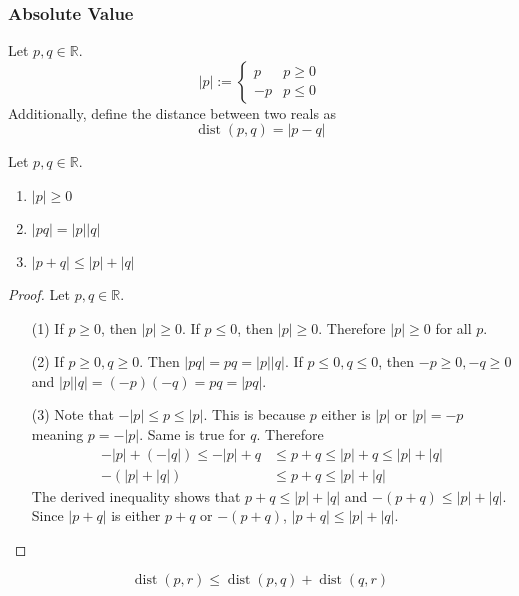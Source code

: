 \documentclass[../notes.tex]{subfiles}
\begin{document}
\subsubsection{Absolute Value}

\begin{definition}
	Let $p, q \in \mathbb{R}$.
	\[
		|p| := \begin{cases}
			p & p \geq 0 \\
			-p & p \leq 0
		\end{cases}
	\]
	Additionally, define the distance between two reals as
	\[
		\operatorname{dist}(p,q) = | p - q |
	\]
\end{definition}

\begin{theorem}
	\label{thm:propsabsvalue}
	Let $p,q \in \mathbb{R}$.
	\begin{enumerate}
		\item $|p| \geq 0$
		\item $|pq| = |p||q|$
		\item \label{itm:triangle_inequality} $|p + q| \leq |p| + |q|$
	\end{enumerate}
\end{theorem}

\begin{proof}
	Let $p,q \in \mathbb{R}$.
	\begin{enumerate}
		\item[(1)]
			If $p \geq 0$, then $|p| \geq 0$. If $p \leq 0$, then $|p| \geq 0$. Therefore $|p| \geq 0$ for all $p$.
		\item[(2)]
			If $p \geq 0, q \geq 0$. Then $|pq| = pq = |p||q|$. If $p \leq 0, q \leq 0$, then $-p \geq 0, -q \geq 0$ and $|p||q| = (-p)(-q) = pq = |pq|$.
		\item[(3)]
			Note that $-|p| \leq p \leq |p|$. This is because $p$ either is $|p|$ or $|p| = -p$ meaning $p = -|p|$. Same is true for $q$. Therefore
			\begin{align*}
				-|p| + (-|q|) \leq -|p| + q &\leq p + q \leq |p| + q \leq |p| + |q| \\
				-(|p| + |q|) &\leq p + q \leq |p| + |q|
			\end{align*}
			The derived inequality shows that $p+q \leq |p| + |q|$ and $-(p+q) \leq |p| + |q|$. Since $|p + q|$ is either $p + q$ or $-(p+q)$, $|p+q| \leq |p| + |q|$.
	\end{enumerate}
\end{proof}

\begin{corollary}
	\[
		\operatorname{dist}(p, r) \leq \operatorname{dist}(p, q) + \operatorname{dist}(q,r)
	\]
\end{corollary}
\end{document}
